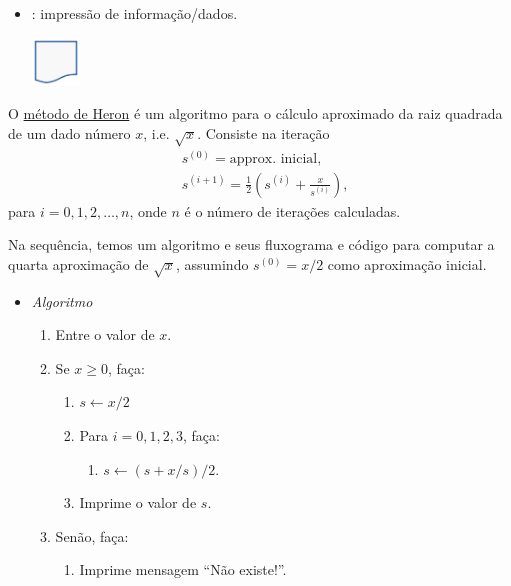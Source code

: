 \begin{itemize}
\begin{center}
  \end{center}
\item {}: impressão de informação/dados.
  \begin{center}
    \includegraphics[width=0.5in]{./cap_lingua/dados/fig_fluxograma/saida.png}
\end{center}
\end{itemize}

\begin{ex}\label{cap_lingua_sec_algoprog:ex:metHeron}
  O \href{https://en.wikipedia.org/wiki/Methods_of_computing_square_roots#Heron's_method}{método de Heron}{\heron} é um algoritmo para o cálculo aproximado da raiz quadrada de um dado número $x$, i.e. $\sqrt{x}$. Consiste na iteração
  \begin{align}
    & s^{(0)} = \text{approx. inicial},\\
    & s^{(i+1)} = \frac{1}{2}\left(s^{(i)} + \frac{x}{s^{(i)}}\right),
  \end{align}
  para $i=0,1,2,\ldots,n$, onde $n$ é o número de iterações calculadas.

  Na sequência, temos um algoritmo e seus fluxograma e código {\python} para computar a quarta aproximação de $\sqrt{x}$, assumindo $s^{(0)} = x/2$ como aproximação inicial.

  \begin{itemize}
  \item \emph{Algoritmo}
    \begin{enumerate}
    \item Entre o valor de $x$.
    \item Se $x\geq 0$, faça:
      \begin{enumerate}
      \item $s \leftarrow x/2$
      \item Para $i = 0,1,2,3$, faça:
        \begin{enumerate}
        \item $s \leftarrow (s + x/s)/2$.
        \end{enumerate}
      \item Imprime o valor de $s$.
      \end{enumerate}
    \item Senão, faça:
      \begin{enumerate}
      \item Imprime mensagem ``Não existe!''.
      \end{enumerate}
    \end{enumerate}


\end{itemize}
\end{ex}
